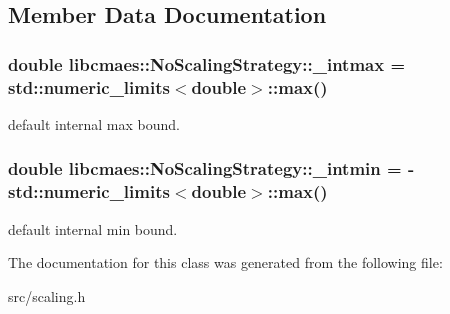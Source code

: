 \subsection{Member Data Documentation}
\hypertarget{classlibcmaes_1_1NoScalingStrategy_aafe4553f1cd6c78e28b7a5f0992bf9b1}{
\subsubsection[{\-\_\-intmax}]{\setlength{\rightskip}{0pt plus 5cm}double libcmaes\-::\-No\-Scaling\-Strategy\-::\-\_\-intmax = std\-::numeric\-\_\-limits$<$double$>$\-::max()}}\label{classlibcmaes_1_1NoScalingStrategy_aafe4553f1cd6c78e28b7a5f0992bf9b1}
default internal max bound. \hypertarget{classlibcmaes_1_1NoScalingStrategy_a69a76fd22f86dfc2fe25093d0b52b051}{
\subsubsection[{\-\_\-intmin}]{\setlength{\rightskip}{0pt plus 5cm}double libcmaes\-::\-No\-Scaling\-Strategy\-::\-\_\-intmin = -\/std\-::numeric\-\_\-limits$<$double$>$\-::max()}}\label{classlibcmaes_1_1NoScalingStrategy_a69a76fd22f86dfc2fe25093d0b52b051}
default internal min bound. 

The documentation for this class was generated from the following file\-:\begin{DoxyCompactItemize}
\item 
src/scaling.\-h\end{DoxyCompactItemize}
